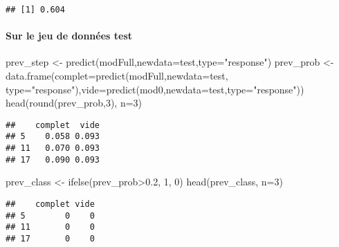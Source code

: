 \documentclass[
]{article}
\newenvironment{Shaded}{\begin{snugshade}}{\end{snugshade}}
\newcommand{\AttributeTok}[1]{\textcolor[rgb]{0.77,0.63,0.00}{#1}}
\newcommand{\DecValTok}[1]{\textcolor[rgb]{0.00,0.00,0.81}{#1}}
\newcommand{\FloatTok}[1]{\textcolor[rgb]{0.00,0.00,0.81}{#1}}
\newcommand{\FunctionTok}[1]{\textcolor[rgb]{0.00,0.00,0.00}{#1}}
\newcommand{\NormalTok}[1]{#1}
\newcommand{\OtherTok}[1]{\textcolor[rgb]{0.56,0.35,0.01}{#1}}
\newcommand{\SpecialCharTok}[1]{\textcolor[rgb]{0.00,0.00,0.00}{#1}}
\newcommand{\StringTok}[1]{\textcolor[rgb]{0.31,0.60,0.02}{#1}}
\begin{document}
\begin{verbatim}
## [1] 0.604
\end{verbatim}

\hypertarget{sur-le-jeu-de-donnuxe9es-test}{%
\paragraph{Sur le jeu de données
test}\label{sur-le-jeu-de-donnuxe9es-test}}

\begin{Shaded}
\begin{Highlighting}[]
\NormalTok{prev\_step }\OtherTok{\textless{}{-}} \FunctionTok{predict}\NormalTok{(modFull,}\AttributeTok{newdata=}\NormalTok{test,}\AttributeTok{type=}\StringTok{"response"}\NormalTok{)}
\NormalTok{prev\_prob }\OtherTok{\textless{}{-}} \FunctionTok{data.frame}\NormalTok{(}\AttributeTok{complet=}\FunctionTok{predict}\NormalTok{(modFull,}\AttributeTok{newdata=}\NormalTok{test, }\AttributeTok{type=}\StringTok{"response"}\NormalTok{),}\AttributeTok{vide=}\FunctionTok{predict}\NormalTok{(mod0,}\AttributeTok{newdata=}\NormalTok{test,}\AttributeTok{type=}\StringTok{"response"}\NormalTok{))}
\FunctionTok{head}\NormalTok{(}\FunctionTok{round}\NormalTok{(prev\_prob,}\DecValTok{3}\NormalTok{), }\AttributeTok{n=}\DecValTok{3}\NormalTok{)}
\end{Highlighting}
\end{Shaded}

\begin{verbatim}
##    complet  vide
## 5    0.058 0.093
## 11   0.070 0.093
## 17   0.090 0.093
\end{verbatim}

\begin{Shaded}
\begin{Highlighting}[]
\NormalTok{prev\_class }\OtherTok{\textless{}{-}} \FunctionTok{ifelse}\NormalTok{(prev\_prob}\SpecialCharTok{\textgreater{}}\FloatTok{0.2}\NormalTok{, }\DecValTok{1}\NormalTok{, }\DecValTok{0}\NormalTok{)}
\FunctionTok{head}\NormalTok{(prev\_class, }\AttributeTok{n=}\DecValTok{3}\NormalTok{)}
\end{Highlighting}
\end{Shaded}

\begin{verbatim}
##    complet vide
## 5        0    0
## 11       0    0
## 17       0    0
\end{verbatim}

\begin{Shaded}
\end{Shaded}
\end{document}
